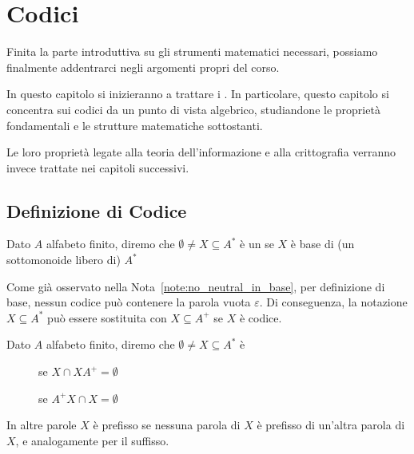 \chapter{Codici}

Finita la parte introduttiva su gli strumenti matematici necessari,
possiamo finalmente addentrarci negli argomenti propri del corso.

In questo capitolo si inizieranno a trattare i .
In particolare, questo capitolo si concentra sui codici da un punto di vista algebrico, studiandone le proprietà fondamentali e le strutture matematiche sottostanti.

Le loro proprietà legate alla teoria dell'informazione e alla crittografia verranno invece trattate nei capitoli successivi.

\section{Definizione di Codice}
\begin{definition}[Codice]
  Dato \(A\) alfabeto finito, diremo che \(\emptyset \neq X \subseteq A^*\) è un  se \(X\) è base di (un sottomonoide libero di) \(A^*\)
\end{definition}

\begin{note}
  Come già osservato nella Nota~\ref{note:no_neutral_in_base}, per definizione di base, nessun codice può contenere la parola vuota \(\varepsilon\).
  Di conseguenza, la notazione \(X \subseteq A^*\) può essere sostituita con \(X \subseteq A^+\) se \(X\) è codice.
\end{note}

\begin{definition}
  Dato \(A\) alfabeto finito, diremo che \(\emptyset \neq X \subseteq A^*\) è
  \begin{description}
    \item[] se \(X\cap XA^+ = \emptyset\)
    \item[] se \(A^+X \cap X = \emptyset\)
  \end{description}
\end{definition}

In altre parole \(X\) è prefisso se nessuna parola di \(X\) è prefisso di un'altra parola di \(X\), e analogamente per il suffisso.

